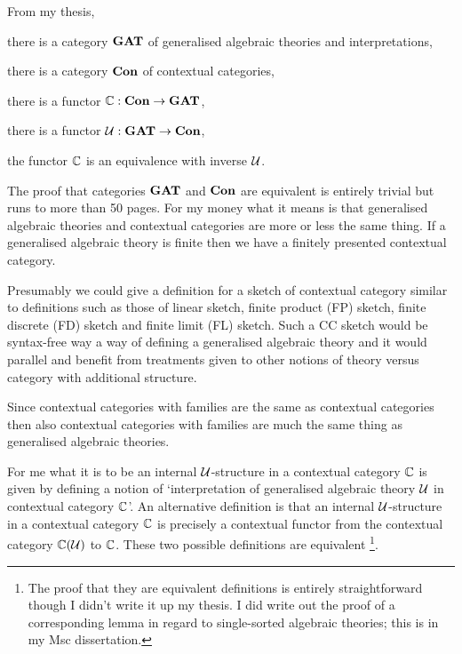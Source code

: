 
\note From my thesis, 
\begin{point}
there is a category $\catGAT$ of generalised algebraic theories and interpretations,
\end{point}
\begin{point}
there is a category $\catCon$ of contextual categories,
\end{point}
\begin{point}
there is a functor $\ccat[C]: \catCon \morph \catGAT$,
\end{point}
\begin{point}
there is a functor $\gat[U]:\catGAT \morph \catCon$,
\end{point}
\begin{point}
the functor $\ccat[C]$ is an equivalence with inverse $\gat[U]$.
\end{point}

\note
The proof that categories $\catGAT$ and $\catCon$ are equivalent  is entirely trivial but runs to more than 50 pages. For my money what it means is that generalised algebraic theories and contextual categories are more or less the same thing. If a generalised algebraic theory is finite then we have a finitely presented contextual category. 

\note
Presumably we could give a definition for a sketch of contextual category 
similar to  definitions such as those of linear sketch, finite product (FP) sketch, finite discrete (FD) sketch and finite limit (FL) sketch. Such a CC sketch would be syntax-free way a way of defining a generalised algebraic theory and it would parallel and benefit from treatments given to other notions of theory versus category with additional structure.

\note
Since contextual categories with families are the same as contextual categories then also
contextual categories with families are much the same thing as generalised algebraic theories. 

\note For me what it is to be an internal $\gat[U]$-structure in a contextual category $\ccat[C]$ is given by defining a notion of `interpretation of  generalised algebraic theory $\gat[U]$ in  contextual category $\ccat[C]$'. 
An alternative definition is that an internal $\gat[U]$-structure in a contextual category $\ccat[C]$ is precisely a 
contextual functor from the contextual category $\CofU$ to $\ccat[C]$. These two possible definitions are equivalent
\footnote{The proof that they are equivalent definitions is entirely straightforward though I didn't write it up my thesis. I did write out the proof of a  corresponding lemma in regard to single-sorted algebraic theories; this is in my Msc dissertation.}.


